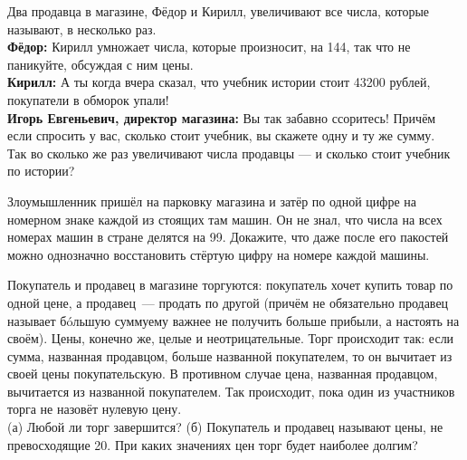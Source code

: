 ﻿
\begin{enumerate}
\itA Два продавца в магазине, Фёдор и Кирилл, увеличивают все числа, которые называют, в несколько раз. \smallskip\\
{\bf Фёдор:} Кирилл умножает числа, которые произносит, на 144, так что не паникуйте, обсуждая с ним цены. \smallskip\\
{\bf Кирилл:} А ты когда вчера сказал, что учебник истории стоит 43200 рублей, покупатели в обморок упали! \smallskip\\
{\bf Игорь Евгеньевич, директор магазина:} Вы так забавно ссоритесь! Причём если спросить у вас, сколько стоит учебник, вы скажете одну и ту же сумму. \smallskip\\
Так во сколько же раз увеличивают числа продавцы — и сколько стоит учебник по истории?

\itB Злоумышленник пришёл на парковку магазина и затёр по одной цифре на номерном знаке каждой из стоящих там машин. Он не знал, что числа на всех номерах машин в стране делятся на 99. Докажите, что даже после его пакостей можно однозначно восстановить стёртую цифру на номере каждой машины.

\itC Покупатель и продавец в магазине торгуются: покупатель хочет купить товар по одной цене, а продавец~— продать по другой (причём не обязательно продавец называет б\'oльшую сумму\scolon ему важнее не получить больше прибыли, а настоять на своём). Цены, конечно же, целые и неотрицательные. Торг происходит так: если сумма, названная продавцом, больше названной покупателем, то он вычитает из своей цены покупательскую. В противном случае цена, названная продавцом, вычитается из названной покупателем. Так происходит, пока один из участников торга не назовёт нулевую цену. \smallskip\\
(а) Любой ли торг завершится? (б) Покупатель и продавец называют цены, не превосходящие 20. При каких значениях цен торг будет наиболее долгим?
\end{enumerate}